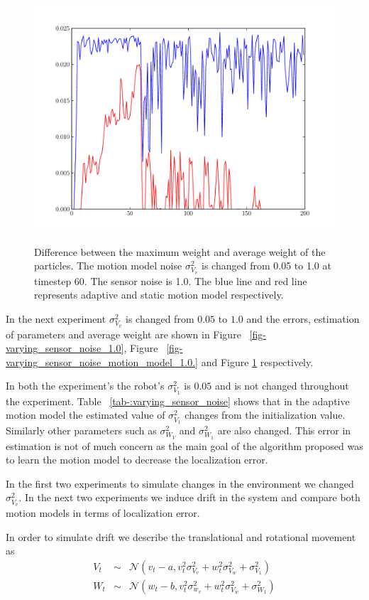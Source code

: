 \documentclass[12pt]{dalcsthesis}
\begin{document}
\begin{figure}[!h]
  \centering
     {\includegraphics[height = 3.0 in]{./plots/200_005_10_s_10_max_weight.pdf}}
  \caption{\label{fig-varying_sensor_noise_sensor_model_1.0_max_weight} Difference between the maximum weight and average weight of the particles. The motion model noise $\sigma_{V_{v}}^{2}$ is changed from 0.05 to 1.0 at timestep 60. The sensor noise is 1.0. The blue line and red line represents adaptive and static motion model respectively.}
\end{figure}

In the next experiment $\sigma_{V_{v}}^2$ is changed from $0.05$ to $1.0$ and the errors, estimation of parameters and average weight are shown in Figure ~\ref{fig-varying_sensor_noise_1.0}, Figure ~\ref{fig-varying_sensor_noise_motion_model_1.0.} and Figure \ref{fig-varying_sensor_noise_sensor_model_1.0_max_weight} respectively. 

In both the experiment's the robot's $\sigma_{V_{1}}^2$ is $0.05$ and is not changed throughout the experiment. Table ~\ref{tab-:varying_sensor_noise} shows that in the adaptive motion model the estimated value of $\sigma_{V_{1}}^2$ changes from the initialization value. Similarly other parameters such as $\sigma_{W_{V}}^2$ and $\sigma_{W_{1}}^2$ are also changed. This error in estimation is not of much concern as the main goal of the algorithm proposed was to learn the motion model to decrease the localization error. 
  
In the first two experiments to simulate changes in the environment we changed $\sigma_{V_{v}}^2$. In the next two experiments we induce drift in the system and compare both motion models in terms of localization error.

In order to simulate drift we describe the translational and rotational movement as
\begin{eqnarray}
\label{eq- drift subtract}
V_{t}&\sim&\mathcal{{N}}(v_{t}-a,v_{t}^{2}\sigma_{V_{v}}^{2}+w_{t}^{2}\sigma_{V_{w}}^{2}+\sigma_{V_{1}}^{2}) \\
W_{t}&\sim&\mathcal{{N}}(w_{t}-b,v_{t}^{2}\sigma_{w_{v}}^{2}+w_{t}^{2}\sigma_{V_{w}}^{2}+\sigma_{W_{1}}^{2})
\end{eqnarray}
\end{document}
